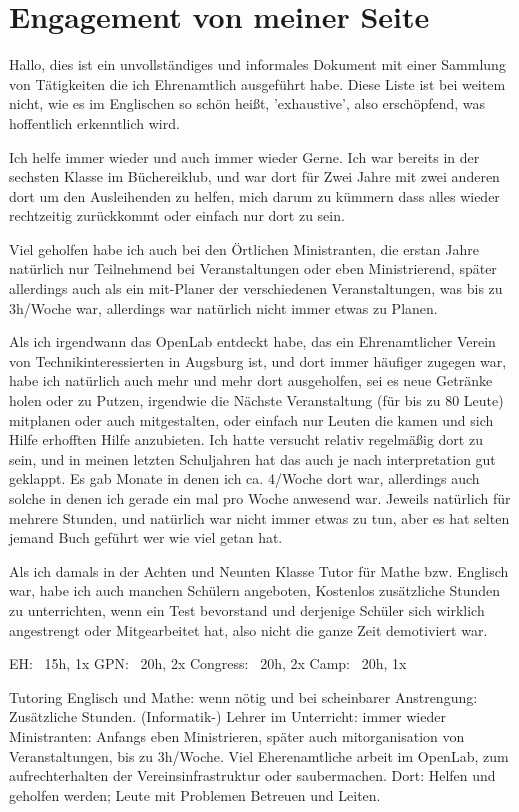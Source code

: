 \documentclass{scrartcl}
\begin{document}
\section*{Engagement von meiner Seite}
Hallo, dies ist ein unvollständiges und informales Dokument mit einer Sammlung von Tätigkeiten
die ich Ehrenamtlich ausgeführt habe. Diese Liste ist bei weitem nicht, wie es im Englischen so
schön heißt, 'exhaustive', also erschöpfend, was hoffentlich erkenntlich wird.

Ich helfe immer wieder und auch immer wieder Gerne. Ich war bereits in der sechsten Klasse im
Büchereiklub, und war dort für Zwei Jahre mit zwei anderen dort um den Ausleihenden zu helfen,
mich darum zu kümmern dass alles wieder rechtzeitig zurückkommt oder einfach nur dort zu sein.

Viel geholfen habe ich auch bei den Örtlichen Ministranten, die erstan Jahre natürlich nur
Teilnehmend bei Veranstaltungen oder eben Ministrierend, später allerdings auch als ein
mit-Planer der verschiedenen Veranstaltungen, was bis zu 3h/Woche war, allerdings war natürlich
nicht immer etwas zu Planen.

Als ich irgendwann das OpenLab entdeckt habe, das ein Ehrenamtlicher
Verein von Technikinteressierten in Augsburg ist, und dort immer häufiger zugegen war, habe ich
natürlich auch mehr und mehr dort ausgeholfen, sei es neue Getränke holen oder zu Putzen, irgendwie
die Nächste Veranstaltung (für bis zu 80 Leute) mitplanen oder auch mitgestalten, oder einfach nur
Leuten die kamen und sich Hilfe erhofften Hilfe anzubieten. Ich hatte versucht relativ regelmäßig
dort zu sein, und in meinen letzten Schuljahren hat das auch je nach interpretation gut geklappt.
Es gab Monate in denen ich ca. 4/Woche dort war, allerdings auch solche in denen ich gerade ein
mal pro Woche anwesend war. Jeweils natürlich für mehrere Stunden, und natürlich war nicht immer
etwas zu tun, aber es hat selten jemand Buch geführt wer wie viel getan hat.

Als ich damals in
der Achten und Neunten Klasse Tutor für Mathe bzw. Englisch war, habe ich auch manchen Schülern
angeboten, Kostenlos zusätzliche Stunden zu unterrichten, wenn ein Test bevorstand und derjenige
Schüler sich wirklich angestrengt oder Mitgearbeitet hat, also nicht die ganze Zeit demotiviert war.





EH: ~15h, 1x
GPN: ~20h, 2x
Congress: ~20h, 2x
Camp: ~20h, 1x


Tutoring Englisch und Mathe: wenn nötig und bei scheinbarer Anstrengung: Zusätzliche Stunden.
(Informatik-) Lehrer im Unterricht: immer wieder
Ministranten: Anfangs eben Ministrieren, später auch mitorganisation von Veranstaltungen, bis zu 3h/Woche.
Viel Eherenamtliche arbeit im OpenLab, zum aufrechterhalten der Vereinsinfrastruktur oder saubermachen.
Dort: Helfen und geholfen werden; Leute mit Problemen Betreuen und Leiten.
\end{document}
